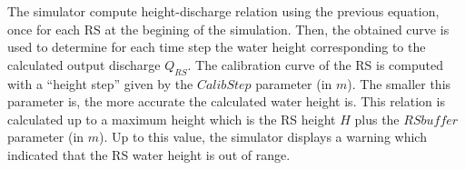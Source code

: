 The simulator compute height-discharge relation using the previous equation, 
once for each RS at the begining of the simulation. Then, the obtained curve is 
used to determine for each time step the water height corresponding to the 
calculated output discharge $Q_{RS}$. The calibration curve of the RS is 
computed with a ``height step'' given by the $Calib Step$ parameter (in $m$). 
The smaller this parameter is, the more accurate the calculated water height 
is. This relation is calculated up to a maximum height which is the RS height 
$H$ plus the $RS buffer$ parameter (in $m$). Up to this value, the simulator displays a warning which indicated that the RS water height is out of range.\\

